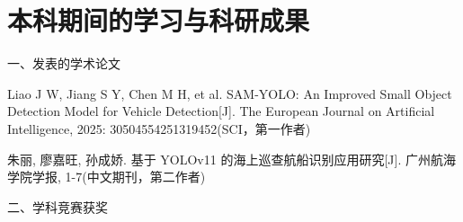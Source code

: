 {
\chapter*{本科期间的学习与科研成果}

\songti

\noindent 一、发表的学术论文

\begin{enumerate}[label={[\arabic*]},wide=2em,itemsep=2pt,topsep=2pt]
  \item Liao J W, Jiang S Y, Chen M H, et al. SAM-YOLO: An Improved Small Object Detection Model for Vehicle Detection[J]. The European Journal on Artificial Intelligence, 2025: 30504554251319452(SCI，第一作者)
  \item 朱丽, 廖嘉旺, 孙成娇. 基于 YOLOv11 的海上巡查航船识别应用研究[J]. 广州航海学院学报, 1-7(中文期刊，第二作者)
\end{enumerate}

\noindent 二、学科竞赛获奖

}
